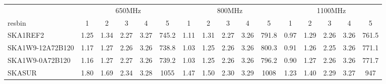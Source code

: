 \begin{table}[!htp]
{{\begin{tabular}{|lccccc||ccccc||ccccc|}
 \tabularnewline \cline{2-16} \multicolumn{1}{c}{ } & \multicolumn{5}{|c}{650MHz}  & \multicolumn{5}{c}{800MHz}  & \multicolumn{5}{c|}{1100MHz} \tabularnewline \cline{1-16} 
 resbin  &1 & 2 & 3 & 4 & 5 & 1 & 2 & 3 & 4 & 5 & 1 & 2 & 3 & 4 & 5 \tabularnewline \hline
SKA1REF2 & 1.25 \cellcolor{blue!23.90} & 1.34 \cellcolor{red!24.69} & 2.27 \cellcolor{green!23.77} & 3.27 \cellcolor{orange!35.40} & 745.2 \cellcolor{purple!18.85} & 1.11 \cellcolor{blue!25.77} & 1.31 \cellcolor{red!27.75} & 2.27 \cellcolor{green!26.08} & 3.26 \cellcolor{orange!25.38} & 791.8 \cellcolor{purple!18.00} & 0.97 \cellcolor{blue!26.30} & 1.29 \cellcolor{red!25.15} & 2.26 \cellcolor{green!26.91} & 3.26 \cellcolor{orange!36.04} & 761.5 \cellcolor{purple!18.00}\\ \hline 
SKA1W9-12A72B120 & 1.17 \cellcolor{blue!18.57} & 1.27 \cellcolor{red!18.28} & 2.26 \cellcolor{green!18.00} & 3.26 \cellcolor{orange!18.00} & 738.8 \cellcolor{purple!18.00} & 1.03 \cellcolor{blue!18.60} & 1.25 \cellcolor{red!18.02} & 2.26 \cellcolor{green!18.00} & 3.26 \cellcolor{orange!18.00} & 800.3 \cellcolor{purple!19.64} & 0.91 \cellcolor{blue!18.41} & 1.26 \cellcolor{red!18.00} & 2.25 \cellcolor{green!18.00} & 3.26 \cellcolor{orange!18.00} & 771.1 \cellcolor{purple!20.18}\\ \hline 
SKA1W9-0A72B120 & 1.16 \cellcolor{blue!18.00} & 1.27 \cellcolor{red!18.00} & 2.27 \cellcolor{green!22.66} & 3.26 \cellcolor{orange!19.20} & 739.2 \cellcolor{purple!18.04} & 1.03 \cellcolor{blue!18.00} & 1.25 \cellcolor{red!18.00} & 2.26 \cellcolor{green!24.67} & 3.26 \cellcolor{orange!21.49} & 796.2 \cellcolor{purple!18.84} & 0.90 \cellcolor{blue!18.00} & 1.27 \cellcolor{red!20.11} & 2.26 \cellcolor{green!26.45} & 3.26 \cellcolor{orange!31.34} & 771.7 \cellcolor{purple!20.31}\\ \hline 
SKASUR & 1.80 \cellcolor{blue!60.00} & 1.69 \cellcolor{red!60.00} & 2.34 \cellcolor{green!60.00} & 3.28 \cellcolor{orange!60.00} & 1055 \cellcolor{purple!60.00} & 1.47 \cellcolor{blue!60.00} & 1.50 \cellcolor{red!60.00} & 2.30 \cellcolor{green!60.00} & 3.29 \cellcolor{orange!60.00} & 1008 \cellcolor{purple!60.00} & 1.23 \cellcolor{blue!60.00} & 1.40 \cellcolor{red!60.00} & 2.29 \cellcolor{green!60.00} & 3.27 \cellcolor{orange!60.00} & 947 \cellcolor{purple!60.00}\tabularnewline \hline 
\end{tabular}}\hfil 
{}}
\end{table}
